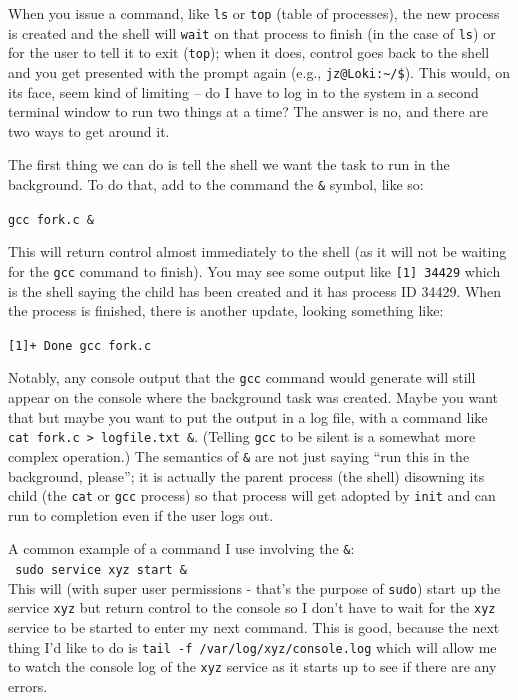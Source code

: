 When you issue a command, like \texttt{ls} or \texttt{top} (table of processes), the new process is created and the shell will \texttt{wait} on that process to finish (in the case of \texttt{ls}) or for the user to tell it to exit (\texttt{top}); when it does, control goes back to the shell and you get presented with the prompt again (e.g., \texttt{jz@Loki:\~{}/\$}). This would, on its face, seem kind of limiting -- do I have to log in to the system in a second terminal window to run two things at a time? The answer is no, and there are two ways to get around it.

The first thing we can do is tell the shell we want the task to run in the background. To do that, add to the command the \texttt{\&} symbol, like so: 

\texttt{gcc fork.c \&}

This will return control almost immediately to the shell (as it will not be waiting for the \texttt{gcc} command to finish). You may see some output like \texttt{[1] 34429} which is the shell saying the child has been created and it has process ID 34429. When the process is finished, there is another update, looking something like:

\texttt{[1]+  Done                    gcc fork.c}

Notably, any console output that the \texttt{gcc} command would generate will still appear on the console where the background task was created. Maybe you want that but maybe you want to put the output in a log file, with a command like \texttt{cat fork.c > logfile.txt \&}. (Telling \texttt{gcc} to be silent is a somewhat more complex operation.) The semantics of \texttt{\&} are not just saying ``run this in the background, please''; it is actually the parent process (the shell) disowning its child (the \texttt{cat} or \texttt{gcc} process) so that process will get adopted by \texttt{init} and can run to completion even if the user logs out.

A common example of a command I use involving the \texttt{\&}:\\
\texttt{ sudo service xyz start \& }\\
This will (with super user permissions - that's the purpose of \texttt{sudo}) start up the service \texttt{xyz} but return control to the console so I don't have to wait for the \texttt{xyz} service to be started to enter my next command. This is good, because the next thing I'd like to do is \texttt{tail -f /var/log/xyz/console.log} which will allow me to watch the console log of the \texttt{xyz} service as it starts up to see if there are any errors.


